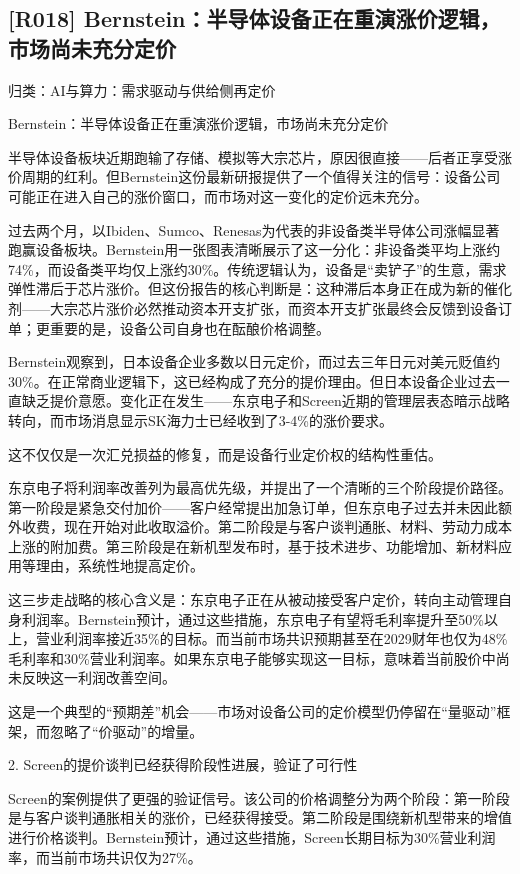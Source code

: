 \documentclass[11pt]{ctexart}
\begin{document}
\subsection{[R018] Bernstein：半导体设备正在重演涨价逻辑，市场尚未充分定价}
{\small\color{refgray}归类：AI与算力：需求驱动与供给侧再定价}

Bernstein：半导体设备正在重演涨价逻辑，市场尚未充分定价

半导体设备板块近期跑输了存储、模拟等大宗芯片，原因很直接——后者正享受涨价周期的红利。但Bernstein这份最新研报提供了一个值得关注的信号：设备公司可能正在进入自己的涨价窗口，而市场对这一变化的定价远未充分。

过去两个月，以Ibiden、Sumco、Renesas为代表的非设备类半导体公司涨幅显著跑赢设备板块。Bernstein用一张图表清晰展示了这一分化：非设备类平均上涨约74\%，而设备类平均仅上涨约30\%。传统逻辑认为，设备是“卖铲子”的生意，需求弹性滞后于芯片涨价。但这份报告的核心判断是：这种滞后本身正在成为新的催化剂——大宗芯片涨价必然推动资本开支扩张，而资本开支扩张最终会反馈到设备订单；更重要的是，设备公司自身也在酝酿价格调整。

Bernstein观察到，日本设备企业多数以日元定价，而过去三年日元对美元贬值约30\%。在正常商业逻辑下，这已经构成了充分的提价理由。但日本设备企业过去一直缺乏提价意愿。变化正在发生——东京电子和Screen近期的管理层表态暗示战略转向，而市场消息显示SK海力士已经收到了3-4\%的涨价要求。

这不仅仅是一次汇兑损益的修复，而是设备行业定价权的结构性重估。

东京电子将利润率改善列为最高优先级，并提出了一个清晰的三个阶段提价路径。第一阶段是紧急交付加价——客户经常提出加急订单，但东京电子过去并未因此额外收费，现在开始对此收取溢价。第二阶段是与客户谈判通胀、材料、劳动力成本上涨的附加费。第三阶段是在新机型发布时，基于技术进步、功能增加、新材料应用等理由，系统性地提高定价。

这三步走战略的核心含义是：东京电子正在从被动接受客户定价，转向主动管理自身利润率。Bernstein预计，通过这些措施，东京电子有望将毛利率提升至50\%以上，营业利润率接近35\%的目标。而当前市场共识预期甚至在2029财年也仅为48\%毛利率和30\%营业利润率。如果东京电子能够实现这一目标，意味着当前股价中尚未反映这一利润改善空间。

这是一个典型的“预期差”机会——市场对设备公司的定价模型仍停留在“量驱动”框架，而忽略了“价驱动”的增量。

2. Screen的提价谈判已经获得阶段性进展，验证了可行性

Screen的案例提供了更强的验证信号。该公司的价格调整分为两个阶段：第一阶段是与客户谈判通胀相关的涨价，已经获得接受。第二阶段是围绕新机型带来的增值进行价格谈判。Bernstein预计，通过这些措施，Screen长期目标为30\%营业利润率，而当前市场共识仅为27\%。
\end{document}
